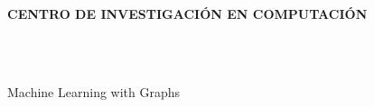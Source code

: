 \makeatletter
\begin{titlepage}
\begin{center}

\uppercase{\textbf{\large{Centro de Investigación en Computación}}}
\\[6cm]

\uppercase{\textbf{\fypcode \\[0.3cm]\@title}}

\vfill

\@author
\\[2cm]

\end{center}

Machine Learning with Graphs\\
\@date
\end{titlepage}
\makeatother